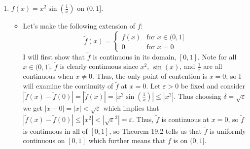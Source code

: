\documentclass[10pt,a4paper]{article}
\theoremstyle{definition}
\begin{document}
\begin{enumerate}[label = (\alph*)]
\begin{itemize}
	\end{itemize}
\item $f(x) = x^2\sin\left(\frac{1}{x}\right)$ on $(0,1]$.
	\begin{itemize}
	\item Let's make the following extension of $f$:
	\[\tilde{f}(x) = \begin{cases}
	f(x) &\text{for } x \in (0,1]\\
	0 &\text{for } x = 0
	\end{cases} \]
	I will first show that $\tilde{f}$ is continuous in its domain, $[0,1]$. Note for all $x \in (0,1]$, $\tilde{f}$ is clearly continuous since $x^2$, $\sin(x)$, and $\frac{1}{x}$ are all continuous when $x \neq 0$. Thus, the only point of contention is $x = 0$, so I will examine the continuity of $\tilde{f}$ at $x = 0$. Let $\varepsilon > 0$ be fixed and consider $|\tilde{f}(x) - \tilde{f}(0)| = |\tilde{f}(x)| = \left|x^2\sin\left(\frac{1}{x}\right)\right| \leq |x^2|$. Thus choosing $\delta = \sqrt{\varepsilon}$ we get $|x - 0| = |x| < \sqrt{\varepsilon}$ which implies that $|\tilde{f}(x) - \tilde{f}(0)| \leq |x^2| < \left|\sqrt{\varepsilon}^2\right| = \varepsilon$. Thus, $\tilde{f}$ is continuous at $x = 0$, so $\tilde{f}$ is continuous in all of $[0,1]$, so Theorem 19.2 tells us that $\tilde{f}$ is uniformly continuous on $[0,1]$ which further means that $f$ is  on $(0,1]$.
	\end{itemize}
\end{enumerate}
\end{document}
